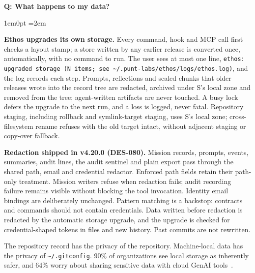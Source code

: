 \documentclass[11pt,letterpaper]{article}
\newcounter{faqnum}
\newenvironment{faqpair}[1]{%
  \needspace{4\baselineskip}%
  \vspace{0.5em}%
  \refstepcounter{faqnum}%
  \noindent\textbf{\color{SectionBlue}Q\thefaqnum: #1}\par\nopagebreak[4]%
  \vspace{0.2em}%
  \begin{adjustwidth}{1em}{0pt}%
  \setlength{\parindent}{0pt}%
  \emergencystretch=2em%
}{%
  \end{adjustwidth}%
  \vspace{0.5em}%
}
\begin{document}
\begin{faqpair}{What happens to my data?}
\textbf{Ethos upgrades its own storage.} Every command, hook and MCP call first checks a layout stamp; a store written by any earlier release is converted once, automatically, with no command to run. The user sees at most one line, {\small\texttt{ethos: upgraded storage (N items; see \textasciitilde/.punt-labs/ethos/logs/ethos.log)}}, and the log records each step. Prompts, reflections and sealed chunks that older releases wrote into the record tree are redacted, archived under S's local zone and removed from the tree; agent-written artifacts are never touched. A busy lock defers the upgrade to the next run, and a loss is logged, never fatal. Repository staging, including rollback and symlink-target staging, uses S's local zone; cross-filesystem rename refuses with the old target intact, without adjacent staging or copy-over fallback. %

\textbf{Redaction shipped in v4.20.0 (DES-080).} Mission records, prompts, events, summaries, audit lines, the audit sentinel and plain export pass through the shared path, email and credential redactor. Enforced path fields retain their path-only treatment. Mission writers refuse when redaction fails; audit recording failure remains visible without blocking the tool invocation. Identity email bindings are deliberately unchanged. Pattern matching is a backstop: contracts and commands should not contain credentials. Data written before redaction is redacted by the automatic storage upgrade, and the upgrade is checked for credential-shaped tokens in files and new history. Past commits are not rewritten.

The repository record has the privacy of the repository. Machine-local data has the privacy of
{\small\texttt{\textasciitilde/.gitconfig}}. 90\% of organizations see local storage as inherently safer, and 64\% worry about sharing sensitive data with cloud GenAI tools~\cite{cisco2025privacy}.
\end{faqpair}
\end{document}
